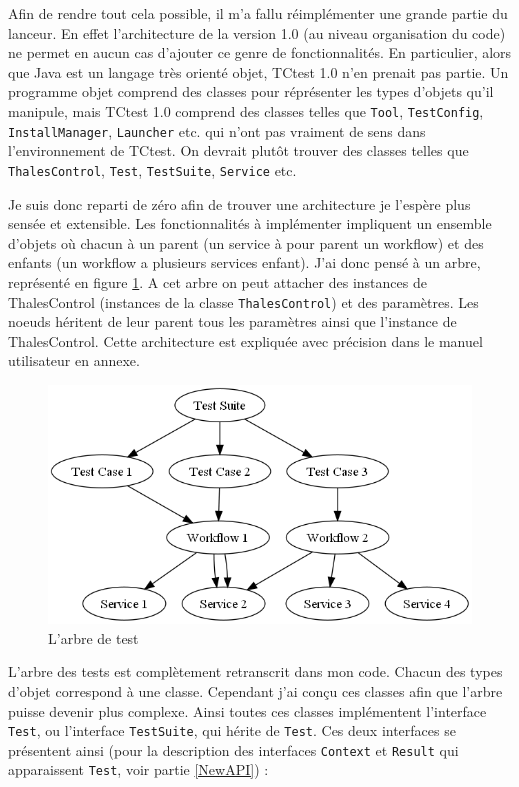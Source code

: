 Afin de rendre tout cela possible, il m'a fallu réimplémenter une grande partie 
du lanceur. En effet l'architecture de la version 1.0 (au niveau organisation 
du code) ne permet en aucun cas d'ajouter ce genre
de fonctionnalités. En particulier, alors que Java est un langage très orienté 
objet, TCtest 1.0 n'en prenait pas partie. Un programme objet
comprend des classes pour réprésenter les types d'objets qu'il manipule, mais 
TCtest 1.0 comprend des classes telles que \verb|Tool|, \verb|TestConfig|, 
\verb|InstallManager|, \verb|Launcher| etc. qui n'ont pas vraiment de sens dans 
l'environnement de TCtest. On devrait plutôt trouver des classes telles que 
\verb|ThalesControl|, \verb|Test|, \verb|TestSuite|, \verb|Service| etc.

Je suis donc reparti de zéro afin de trouver une architecture je l'espère plus 
sensée et 
extensible. Les fonctionnalités à implémenter impliquent un ensemble d'objets
où chacun à un parent (un service à pour parent un workflow) et des enfants
(un workflow a plusieurs services enfant). J'ai donc pensé à un arbre, 
représenté en figure \ref{TestTreeFig}. A cet arbre on peut attacher des 
instances de ThalesControl (instances de la classe \verb|ThalesControl|) et des 
paramètres. Les noeuds héritent de leur parent tous les paramètres ainsi que 
l'instance de ThalesControl. Cette architecture est expliquée avec précision 
dans le manuel utilisateur en annexe.

\begin{figure}[htb]
	\centering
	\includegraphics[scale=0.6]{test_tree.png}
	\caption{L'arbre de test}
	\label{TestTreeFig}
\end{figure}

L'arbre des tests est complètement retranscrit dans mon code. Chacun des types
d'objet correspond à une classe. Cependant j'ai conçu ces classes afin que 
l'arbre puisse devenir plus complexe. Ainsi toutes ces classes implémentent
l'interface \verb|Test|, ou l'interface \verb|TestSuite|, qui hérite de 
\verb|Test|. Ces deux interfaces se présentent ainsi (pour la description des 
interfaces \verb|Context| et \verb|Result| qui apparaissent \verb|Test|, voir 
partie \ref{NewAPI}) :

